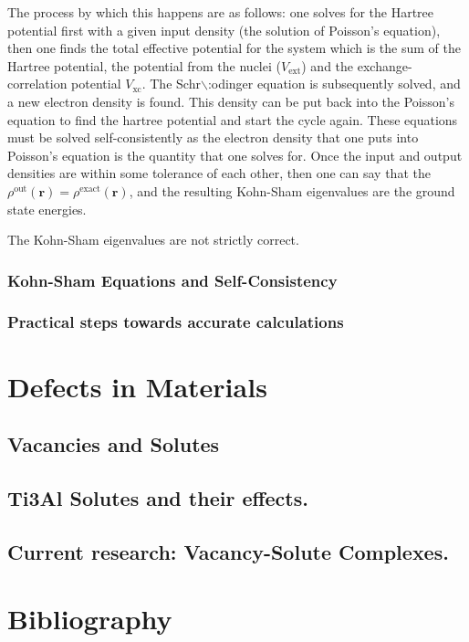 \documentclass[11pt]{article}
\begin{document}
The process by which this happens are as follows: one solves for the Hartree potential
first with a given input density (the solution of Poisson's equation), then one finds the
total effective potential for the system which is the sum of the Hartree potential, the
potential from the nuclei (\(V_{\text{ext}}\)) and the exchange-correlation potential
\(V_{\text{xc}}\). The Schr$\backslash$:odinger equation is subsequently solved, and a new electron
density is found. This density can be put back into the Poisson's equation to find the
hartree potential and start the cycle again. These equations must be solved
self-consistently as the electron density that one puts into Poisson's equation is the
quantity that one solves for. Once the input and output densities are within some
tolerance of each other, then one can say that the \(\rho^{\text{out}}(\mathbf{r}) = \rho^{\text{exact}}(\mathbf{r})\),
and the resulting Kohn-Sham eigenvalues are the ground state energies. 

The Kohn-Sham eigenvalues are not strictly correct. 


\subsubsection{Kohn-Sham Equations and Self-Consistency}
\label{sec:orgca19915}


\subsubsection{Practical steps towards accurate calculations}
\label{sec:org197c46a}



\section{Defects in Materials}
\label{sec:org8207af3}

\subsection{Vacancies and Solutes}
\label{sec:org77dbb0f}

\subsection{Ti3Al Solutes and their effects.}
\label{sec:orgf10c21b}

\subsection{Current research: Vacancy-Solute Complexes.}
\label{sec:org7f7b8a7}


\section{Bibliography}
\label{sec:org8f96ad0}
\label{org5fc5d83}



\end{document}
